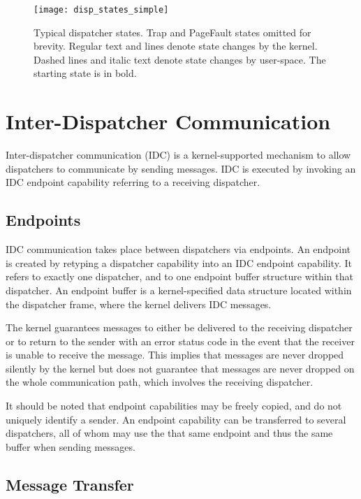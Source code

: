 \documentclass{scrreprt}
\begin{document}
  \begin{figure}
    \centering
    \texttt{[image: disp\_states\_simple]}
    \caption[Typical dispatcher states]{Typical dispatcher states.
      Trap and PageFault states
      omitted for brevity. Regular text and lines denote state changes
      by the kernel. Dashed lines and italic text denote state changes
      by user-space. The starting state is in bold.}
    \label{fig:dispstates}
  \end{figure}

  \section{Inter-Dispatcher Communication}\label{sec:IDC}

  Inter-dispatcher communication (IDC) is a kernel-supported mechanism
  to allow dispatchers to communicate by sending messages. IDC is
  executed by invoking an IDC endpoint capability referring to a
  receiving dispatcher.

  \subsection{Endpoints}

  IDC communication takes place between dispatchers via endpoints.
  An endpoint is created by retyping a dispatcher capability
  into an IDC endpoint capability. It refers to exactly one dispatcher, and
  to one endpoint buffer structure within that dispatcher.
  An endpoint buffer is a kernel-specified data structure located within the
  dispatcher frame, where the kernel delivers IDC messages.

  The kernel guarantees messages to either be delivered to the
  receiving dispatcher or to return to the sender with an error status
  code in the event that the receiver is unable to receive the message.
  This implies that messages are never dropped silently by the kernel but does
  not guarantee that messages are never dropped on the whole communication path,
  which involves the receiving dispatcher.

  It should be noted that endpoint capabilities may be freely copied, and do not
  uniquely identify a sender. An endpoint capability can be
  transferred to several dispatchers, all of whom may use the that same
  endpoint and thus the same buffer when sending messages.

  \subsection{Message Transfer}
\end{document}
